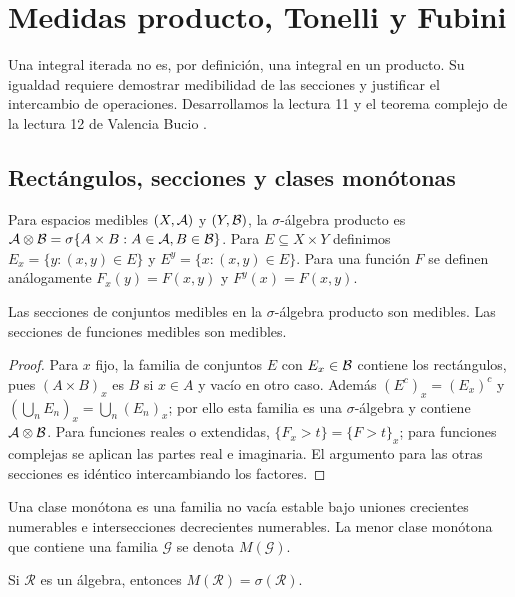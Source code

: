 \chapter{Medidas producto, Tonelli y Fubini}\label{cap:v2-06}
Una integral iterada no es, por definición, una integral en un producto. Su igualdad requiere demostrar medibilidad de las secciones y justificar el intercambio de operaciones. Desarrollamos la lectura 11 y el teorema complejo de la lectura 12 de Valencia Bucio \cite{valencia2}.

\section{Rectángulos, secciones y clases monótonas}\label{lectura:v2-11}
\begin{definicion}
Para espacios medibles $(X,\mathcal A)$ y $(Y,\mathcal B)$, la $\sigma$-álgebra producto es $\mathcal A\otimes\mathcal B=\sigma\{A\times B:A\in\mathcal A,B\in\mathcal B\}$. Para $E\subseteq X\times Y$ definimos $E_x=\{y:(x,y)\in E\}$ y $E^y=\{x:(x,y)\in E\}$. Para una función $F$ se definen análogamente $F_x(y)=F(x,y)$ y $F^y(x)=F(x,y)$.
\end{definicion}
\begin{lema}\label{lema:v2-secciones}
Las secciones de conjuntos medibles en la $\sigma$-álgebra producto son medibles. Las secciones de funciones medibles son medibles.
\end{lema}
\begin{proof}
Para $x$ fijo, la familia de conjuntos $E$ con $E_x\in\mathcal B$ contiene los rectángulos, pues $(A\times B)_x$ es $B$ si $x\in A$ y vacío en otro caso. Además $(E^c)_x=(E_x)^c$ y $(\bigcup_nE_n)_x=\bigcup_n(E_n)_x$; por ello esta familia es una $\sigma$-álgebra y contiene $\mathcal A\otimes\mathcal B$. Para funciones reales o extendidas, $\{F_x>t\}=\{F>t\}_x$; para funciones complejas se aplican las partes real e imaginaria. El argumento para las otras secciones es idéntico intercambiando los factores.
\end{proof}
\begin{definicion}
Una clase monótona es una familia no vacía estable bajo uniones crecientes numerables e intersecciones decrecientes numerables. La menor clase monótona que contiene una familia $\mathcal G$ se denota $M(\mathcal G)$.
\end{definicion}
\begin{teorema}\label{teo:v2-clasemonotona}
Si $\mathcal R$ es un álgebra, entonces $M(\mathcal R)=\sigma(\mathcal R)$.
\end{teorema}
